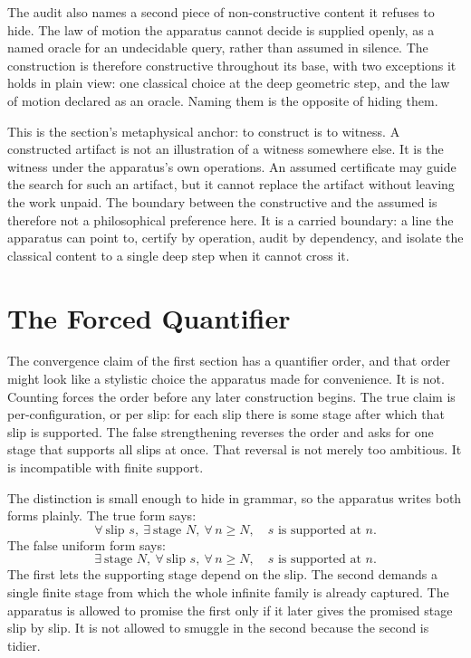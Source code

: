 The audit also names a second piece of non-constructive content it refuses to
hide. The law of motion the apparatus cannot decide is supplied openly, as a named
oracle for an undecidable query, rather than assumed in silence. The construction is
therefore constructive throughout its base, with two exceptions it holds in plain
view: one classical choice at the deep geometric step, and the law of motion
declared as an oracle. Naming them is the opposite of hiding them.

This is the section's metaphysical anchor: to construct is to witness. A constructed
artifact is not an illustration of a witness somewhere else. It is the witness
under the apparatus's own operations. An assumed certificate may guide the
search for such an artifact, but it cannot replace the artifact without leaving
the work unpaid. The boundary between the constructive and the assumed is
therefore not a philosophical preference here. It is a carried boundary: a line
the apparatus can point to, certify by operation, audit by dependency, and
isolate the classical content to a single deep step when it cannot cross it.

\section{The Forced Quantifier}

The convergence claim of the first section has a quantifier order, and that order
might look like a stylistic choice the apparatus made for convenience. It is not.
Counting forces the order before any later construction begins. The true claim is
per-configuration, or per slip: for each slip there is some stage after which that
slip is supported. The false strengthening reverses the order and asks for one
stage that supports all slips at once. That reversal is not merely too ambitious.
It is incompatible with finite support.

The distinction is small enough to hide in grammar, so the apparatus writes both
forms plainly. The true form says:
\[
  \forall\ \text{slip } s,\ \exists\ \text{stage } N,\ \forall\, n \ge N,\quad
  s \text{ is supported at } n .
\]
The false uniform form says:
\[
  \exists\ \text{stage } N,\ \forall\ \text{slip } s,\ \forall\, n \ge N,\quad
  s \text{ is supported at } n .
\]
The first lets the supporting stage depend on the slip. The second demands a
single finite stage from which the whole infinite family is already captured. The
apparatus is allowed to promise the first only if it later gives the promised
stage slip by slip. It is not allowed to smuggle in the second because the second
is tidier.

